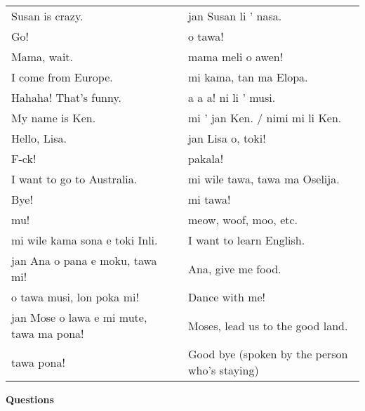 \begin{supertabular}{p{5,5cm}|ll}
Susan is crazy.  && jan Susan li ' nasa. \\ %
Go!  && o tawa! \\ %
Mama, wait.  && mama meli o awen! \\ %
I come from Europe. && mi kama, tan ma Elopa. \\ %
Hahaha! That's funny.  && a a a! ni li ' musi. \\ %
My name is Ken.  && mi ' jan Ken. / nimi mi li Ken. \\ %
Hello, Lisa.  && jan Lisa o, toki! \\ %
F-ck! && pakala! \\ %
I want to go to Australia. && mi wile tawa, tawa ma Oselija. \\  %
Bye!  && mi tawa!  \\ %
mu!  && meow, woof, moo, etc. \\
mi wile kama sona e toki Inli.  && I want to learn English. \\
jan Ana o pana e moku, tawa mi!  && Ana, give me food. \\
o tawa musi, lon poka mi!  && Dance with me! \\
jan Mose o lawa e mi mute, tawa ma pona!  && Moses, lead us to the good land. \\
tawa pona!  && Good bye (spoken by the person who's staying) \\
\end{supertabular} 

\textbf{Questions} 
\label{'questions_using_seme'}

